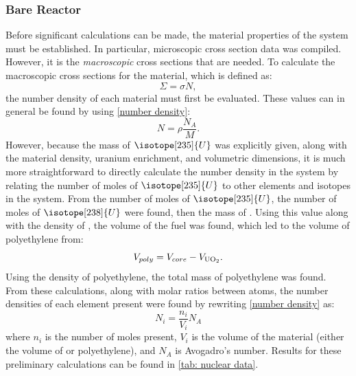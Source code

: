\documentclass{anstrans}
\begin{document}
    \subsubsection{Bare Reactor}\label{subsubsec:bare-reactor}
    Before significant calculations can be made, the material properties of the system must be established.
    In particular, microscopic cross section data was compiled.
    However, it is the \textit{macroscopic} cross sections that are needed.
    To calculate the macroscopic cross sections for the material, which is defined as:
    \begin{equation}
        \label{macroscopic xsection}
        \Sigma = \sigma N,
    \end{equation}
    the number density of each material must first be evaluated.
    These values can in general be found by using \cref{number density}:
    \begin{equation}
        \label{number density}
        N=\rho \frac{N_A}{M}.
    \end{equation}
    However, because the mass of $\isotope[235]{U}$ was explicitly given, along with the material density, uranium enrichment, and volumetric dimensions, it is much more straightforward to directly calculate the number density in the system by relating the number of moles of $\isotope[235]{U}$ to other elements and isotopes in the system.
    From the number of moles of $\isotope[235]{U}$, the number of moles of $\isotope[238]{U}$ were found, then the mass of .
    Using this value along with the density of , the volume of the fuel was found, which led to the volume of polyethylene from:
    \begin{equation}
        \label{volume of poly}
        V_{poly}=V_{core} - V_{\ce{UO_2}}.
    \end{equation}
    Using the density of polyethylene, the total mass of polyethylene was found.
    From these calculations, along with molar ratios between atoms, the number densities of each element present were found by rewriting \cref{number density} as:
    \begin{equation}
        \label{rewritten number density}
        N_i = \frac{n_i}{V_i}N_A
    \end{equation}
    where $n_i$ is the number of moles present, $V_i$ is the volume of the material (either the volume of  or polyethylene), and $N_A$ is Avogadro's number.
    Results for these preliminary calculations can be found in \cref{tab: nuclear data}.
\end{document}
